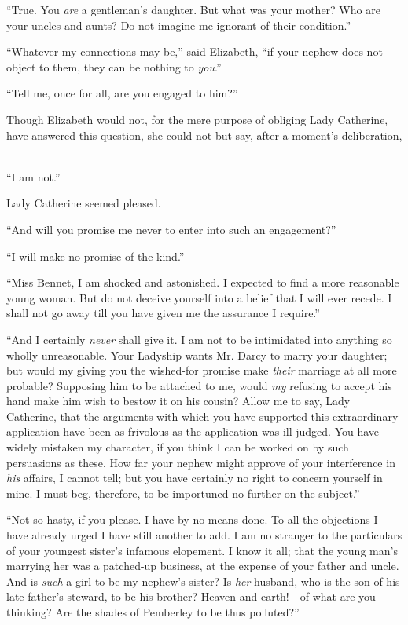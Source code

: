 ``True. You \textit{are} a gentleman's daughter. But what was your mother? Who are your uncles and aunts? Do not imagine me ignorant of their condition.''

``Whatever my connections may be,'' said Elizabeth, ``if your nephew does not object to them, they can be nothing to \textit{you}.''

``Tell me, once for all, are you engaged to him?''

Though Elizabeth would not, for the mere purpose of obliging Lady Catherine, have answered this question, she could not but say, after a moment's deliberation,---

``I am not.''

Lady Catherine seemed pleased.

``And will you promise me never to enter into such an engagement?''

``I will make no promise of the kind.''

``Miss Bennet, I am shocked and astonished. I expected to find a more reasonable young woman. But do not deceive yourself into a belief that I will ever recede. I shall not go away till you have given me the assurance I require.''

``And I certainly \textit{never} shall give it. I am not to be intimidated into anything so wholly unreasonable. Your Ladyship wants Mr. Darcy to marry your daughter; but would my giving you the wished-for promise make \textit{their} marriage at all more probable? Supposing him to be attached to me, would \textit{my} refusing to accept his hand make him wish to bestow it on his cousin? Allow me to say, Lady Catherine, that the arguments with which you have supported this extraordinary application have been as frivolous as the application was ill-judged. You have widely mistaken my character, if you think I can be worked on by such persuasions as these. How far your nephew might approve of your interference in \textit{his} affairs, I cannot tell; but you have certainly no right to concern yourself in mine. I must beg, therefore, to be importuned no further on the subject.''

``Not so hasty, if you please. I have by no means done. To all the objections I have already urged I have still another to add. I am no stranger to the particulars of your youngest sister's infamous elopement. I know it all; that the young man's marrying her was a patched-up business, at the expense of your father and uncle. And is \textit{such} a girl to be my nephew's sister? Is \textit{her} husband, who is the son of his late father's steward, to be his brother? Heaven and earth!---of what are you thinking? Are the shades of Pemberley to be thus polluted?''

